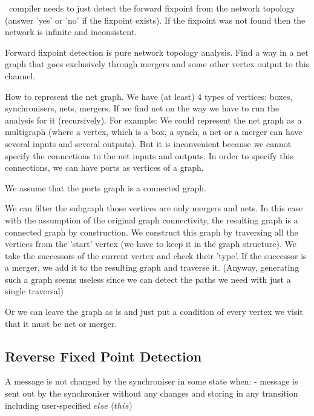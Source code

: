 \ak\ compiler needs to just detect the forward fixpoint from the network topology (answer 'yes' or 'no' if the fixpoint exists). If the fixpoint was not found then the network is infinite and inconsistent.

Forward fixpoint detection is pure network topology analysis. Find a way in a net graph that goes exclusively through mergers and some other vertex output to this channel.

How to represent the net graph.
We have (at least) 4 types of vertices: boxes, synchronisers, nets, mergers.
If we find net on the way we have to run the analysis for it (recursively). For example:
%
We could represent the net graph as a multigraph (where a vertex, which is a box, a synch, a net or a merger can have several inputs and several outputs).
But it is inconvenient because we cannot specify the connections to the net inputs and outputs. In order to specify this connections, we can have ports as vertices of a graph.

We assume that the ports graph is a connected graph.

We can filter the subgraph those vertices are only mergers and nets. In this case with the assumption of the original graph connectivity, the resulting graph is a connected graph by construction.
We construct this graph by traversing all the vertices from the 'start' vertex (we have to keep it in the graph structure). We take the successors of the current vertex and check their 'type'. If the successor is a merger, we add it to the resulting graph and traverse it. (Anyway, generating such a graph seems useless since we can detect the paths we need with just a single traversal)

Or we can leave the graph as is and just put a condition of every vertex we visit that it must be net or merger.


    \subsection{Reverse Fixed Point Detection\label{rfp_detect}}
A message is not changed by the synchroniser in some state when:
- message is sent out by the synchroniser without any changes and storing in any transition including user-specified $else$ ($this$)

